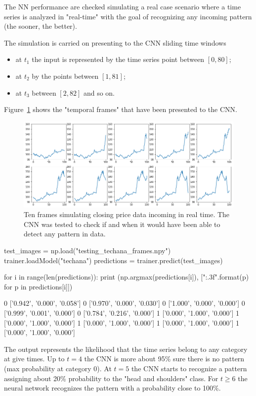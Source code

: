 The NN performance are checked simulating a real case scenario where a time series is analyzed in "real-time" with the goal of recognizing any incoming pattern (the sooner, the better). 

The simulation is carried on presenting to the CNN sliding time windows
\begin{itemize}
	\item at $t_1$ the input is represented by the time series point between \([0, 80]\);
	\item at $t_2$ by the points between \([1, 81]\);
	\item at $t_3$ between \([2, 82]\) and so on.
\end{itemize}

Figure~\ref{fig:frame_simulation} shows the "temporal frames" that have been presented to the CNN.

\begin{figure}
\centering
\includegraphics[width=\textwidth]{figures/tech_ana_frames}
\caption{Ten frames simulating closing price data incoming in real time. The CNN was tested to check if and when it would have been able to detect any pattern in data.}
\label{fig:frame_simulation}
\end{figure}

\begin{ipython}
test_images = np.load("testing_techana_frames.npy")
trainer.loadModel("techana")
predictions = trainer.predict(test_images)

for i in range(len(predictions)):
    print (np.argmax(predictions[i]), ["{:.3f}".format(p) for p in predictions[i]])
\end{ipython}
\begin{ioutput}
0 ['0.942', '0.000', '0.058']
0 ['0.970', '0.000', '0.030']
0 ['1.000', '0.000', '0.000']
0 ['0.999', '0.001', '0.000']
0 ['0.784', '0.216', '0.000']
1 ['0.000', '1.000', '0.000']
1 ['0.000', '1.000', '0.000']
1 ['0.000', '1.000', '0.000']
1 ['0.000', '1.000', '0.000']
1 ['0.000', '1.000', '0.000']
\end{ioutput}
\noindent
The output represents the likelihood that the time series  belong to any category at give times. Up to $t=4$ the CNN is more about 95\% sure there is no pattern (max probability at category 0). 
At $t=5$ the CNN starts to recognize a pattern assigning about 20\% probability to the "head and shoulders" class. For $t\geq 6$ the neural network recognizes the pattern with a probability close to 100\%.
	
